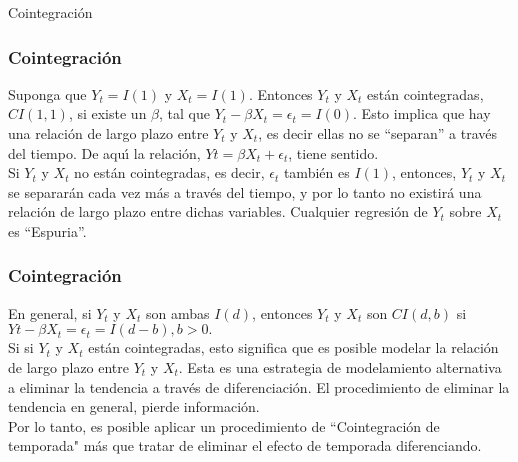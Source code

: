 \documentclass[spanish,xcolor=table]{beamer}
\begin{document}
\begin{section}{Cointegraci\'on}
\begin{frame}
\frametitle{Cointegraci\'on}

Suponga que $Y_t = I(1)$ y $X_t=I(1)$. Entonces $Y_t$ y $X_t$ est\'an cointegradas, $CI(1,1)$, si existe un $\beta$, tal que $Y_t - \beta X_t = \epsilon_t = I(0)$. Esto implica que hay una relaci\'on de largo plazo entre $Y_t$ y $X_t$,  es decir ellas no se ``separan” a trav\'es del tiempo. De aqu\'\i{} la relaci\'on, $Yt= \beta X_t + \epsilon_t$, tiene sentido.\\
\vspace{4mm}	
Si $Y_t$ y $X_t$ no est\'an cointegradas, es decir, $\epsilon_t$ tambi\'en es $I(1)$, entonces, $Y_t$ y $X_t$ se separar\'an cada vez más a trav\'es del tiempo, y por lo tanto no existir\'a una relaci\'on de largo plazo entre dichas variables. Cualquier regresi\'on de $Y_t$ sobre $X_t$ es ``Espuria”.


\end{frame}

\begin{frame}
\frametitle{Cointegraci\'on}

En general, si $Y_t$ y $X_t$ son ambas $I(d)$, entonces $Y_t$ y $X_t$ son $CI(d,b)$ si $Yt - \beta X_t = \epsilon_t  = I(d-b), b>0.$\\
 \vspace{4mm}	
Si si $Y_t$ y $X_t$ est\'an cointegradas, esto significa que es posible modelar la relaci\'on de largo plazo entre $Y_t$ y $X_t$. Esta es una estrategia de modelamiento alternativa a eliminar la tendencia a trav\'es de diferenciaci\'on. El procedimiento de eliminar la tendencia en general, pierde informaci\'on. \\
\vspace{4mm}	
Por lo tanto, es posible aplicar un procedimiento de ``Cointegraci\'on de temporada" m\'as que tratar de eliminar el efecto de temporada diferenciando.\\

\end{frame}
\end{section}
\end{document}

